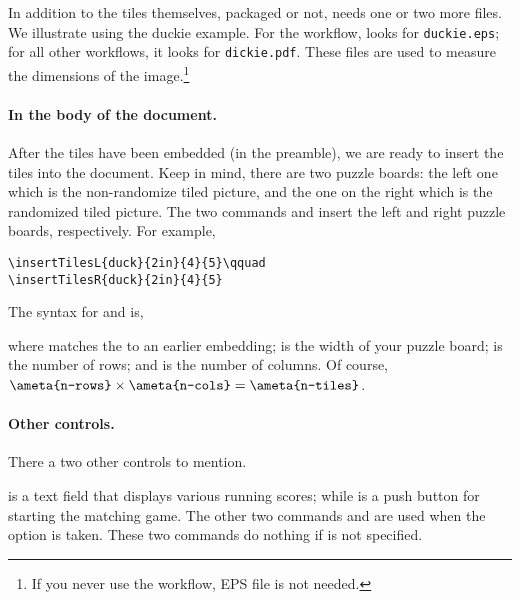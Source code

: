 \documentclass{article}
\begin{document}
In addition to the tiles themselves, packaged or not,  needs
one or two more files. We illustrate using the duckie example. For the
 workflow,  looks for
\texttt{duckie.eps}; for all other workflows, it looks for
\texttt{dickie.pdf}. These files are used to measure the dimensions of the
image.\footnote{If you never use the  workflow,
EPS file is not needed.}


\paragraph*{In the body of the document.}

After the tiles have been embedded (in the preamble), we are ready to insert
the tiles into the document. Keep in mind, there are two puzzle boards:
the left one which is the non-randomize tiled picture, and the one on the right
which is the randomized tiled picture. The two commands  and 
insert the left and right puzzle boards, respectively. For example,
\begin{Verbatim}[xleftmargin=\parindent]
\insertTilesL{duck}{2in}{4}{5}\qquad
\insertTilesR{duck}{2in}{4}{5}
\end{Verbatim}
The syntax for  and  is,
\bVerb{}%
%
\begin{dCmd}[commandchars=!()]{\bxSize}
\end{dCmd}
\eVerb where  matches the  to an earlier embedding;
 is the width of your puzzle board;  is the number
of rows; and  is the number of columns. Of course, $\texttt{\ameta{n-rows}}\times\texttt{\ameta{n-cols}}=\texttt{\ameta{n-tiles}}$.

\paragraph*{Other controls.} There a two other controls to mention.
\bVerb{}%
%
\begin{dCmd}[commandchars=!()]{\bxSize}
\end{dCmd}
\eVerb {} is a text field that displays various running scores; while
 is a push button for starting the matching game. The other two
commands  and  are used when the 
option is taken. These two commands do nothing if  is not specified.
\end{document}
